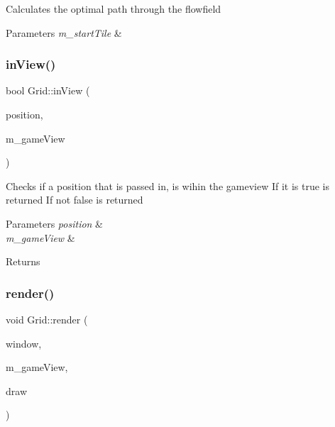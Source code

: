 Calculates the optimal path through the flowfield 


\begin{DoxyParams}{Parameters}
{\em m\+\_\+start\+Tile} & \\
\hline
\end{DoxyParams}
\mbox{\label{class_grid_a328dbe72e123c3e1fbae0cb018f61402}} 
\subsubsection{\texorpdfstring{inView()}{inView()}}
{\footnotesize\ttfamily bool Grid\+::in\+View (\begin{DoxyParamCaption}\item[{sf\+::\+Vector2f}]{position,  }\item[{sf\+::\+View \&}]{m\+\_\+game\+View }\end{DoxyParamCaption})}



Checks if a position that is passed in, is wihin the gameview If it is true is returned If not false is returned 


\begin{DoxyParams}{Parameters}
{\em position} & \\
\hline
{\em m\+\_\+game\+View} & \\
\hline
\end{DoxyParams}
\begin{DoxyReturn}{Returns}

\end{DoxyReturn}
\mbox{\label{class_grid_aa30713317eef1336131d413213483c0c}} 
\subsubsection{\texorpdfstring{render()}{render()}}
{\footnotesize\ttfamily void Grid\+::render (\begin{DoxyParamCaption}\item[{sf\+::\+Render\+Window \&}]{window,  }\item[{sf\+::\+View \&}]{m\+\_\+game\+View,  }\item[{bool}]{draw }\end{DoxyParamCaption})}



